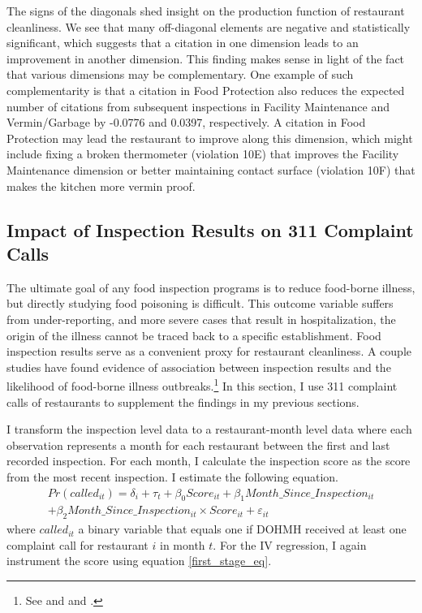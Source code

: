 \documentclass[10pt]{article} %
\begin{document}
The signs of the diagonals shed insight on the production function of restaurant cleanliness. We see that many off-diagonal elements are negative and statistically significant, which suggests that a citation in one dimension leads to an improvement in another dimension. This finding makes sense in light of the fact that various dimensions may be complementary. One example of such complementarity is that a citation in Food Protection also reduces the expected number of citations from subsequent inspections in Facility Maintenance and Vermin/Garbage by -0.0776 and 0.0397, respectively. A citation in Food Protection may lead the restaurant to improve along this dimension, which might include fixing a broken thermometer (violation 10E) that improves the Facility Maintenance dimension or better maintaining contact surface (violation 10F) that makes the kitchen more vermin proof. 

\subsection{Impact of Inspection Results on 311 Complaint Calls}
\label{complaints_analysis}
The ultimate goal of any food inspection programs is to reduce food-borne illness, but directly studying food poisoning is difficult. This outcome variable suffers from under-reporting, and more severe cases that result in hospitalization, the origin of the illness cannot be traced back to a specific establishment. Food inspection results serve as a convenient proxy for restaurant cleanliness. A couple studies have found evidence of association between inspection results and the likelihood of food-borne illness outbreaks.\footnote{See \cite{Irwin_89} and \cite{petran_12} and \cite{petran_12_a}.} In this section, I use 311 complaint calls of restaurants to supplement the findings in my previous sections.

I transform the inspection level data to a restaurant-month level data where each observation represents a month for each restaurant between the first and last recorded inspection. For each month, I calculate the inspection score as the score from the most recent inspection. I estimate the following equation.
\begin{align}
\label{complaint}
    Pr(called_{it}) = \delta_i + \tau_t + \beta_0 Score_{it} + \beta_1 Month\_Since\_Inspection_{it} \nonumber \\
    + \beta_2 Month\_Since\_Inspection_{it} \times Score_{it} + \varepsilon_{it}
\end{align}
where $called_{it}$ a binary variable that equals one if DOHMH received at least one complaint call for restaurant $i$ in month $t$. For the IV regression, I again instrument the score using equation \eqref{first_stage_eq}. 
\end{document}
